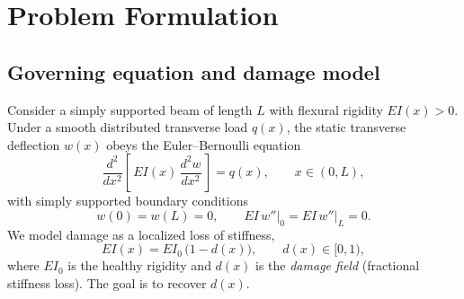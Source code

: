 \documentclass[11pt]{article}
\newcommand{\EI}{\mathit{EI}}
\begin{document}
\section{Problem Formulation}
\subsection{Governing equation and damage model}
Consider a simply supported beam of length $L$ with flexural rigidity
$\EI(x)>0$. Under a smooth distributed transverse load $q(x)$, the static
transverse deflection $w(x)$ obeys the Euler--Bernoulli equation
\begin{equation}
  \frac{d^2}{dx^2}\!\left[\,\EI(x)\,\frac{d^2 w}{dx^2}\,\right] = q(x),
  \qquad x\in(0,L),
  \label{eq:eb}
\end{equation}
with simply supported boundary conditions
\begin{equation}
  w(0)=w(L)=0,\qquad \EI\,w''\big|_{0}=\EI\,w''\big|_{L}=0 .
  \label{eq:bc}
\end{equation}
We model damage as a localized loss of stiffness,
\begin{equation}
  \EI(x) = \EI_0\,\bigl(1-d(x)\bigr),\qquad d(x)\in[0,1),
  \label{eq:damage}
\end{equation}
where $\EI_0$ is the healthy rigidity and $d(x)$ is the \emph{damage field}
(fractional stiffness loss). The goal is to recover $d(x)$.
\end{document}
